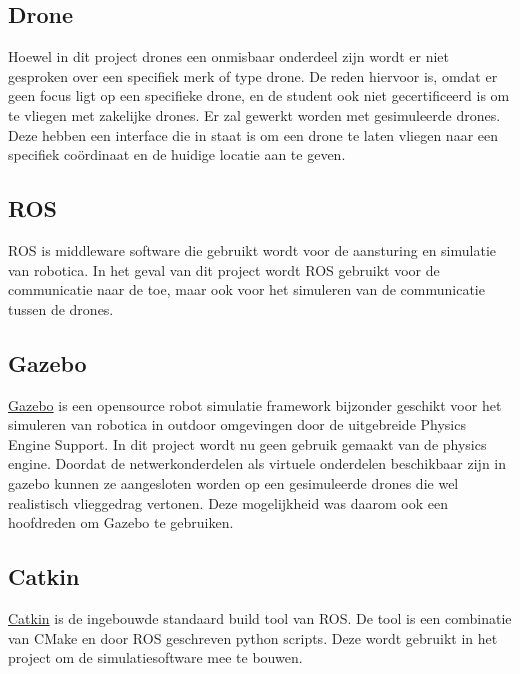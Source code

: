 \documentclass[a4paper, 11pt, oneside]{report}
\begin{document}
\subsection{Drone}
\label{inleiding:werkomgeving:drone}
Hoewel in dit project drones een onmisbaar onderdeel zijn wordt er niet gesproken over een specifiek merk of type drone.
De reden hiervoor is, omdat er geen focus ligt op een specifieke drone, en de student ook niet gecertificeerd is om te vliegen met zakelijke drones.
Er zal gewerkt worden met gesimuleerde drones. 
Deze hebben een interface die in staat is om een drone te laten vliegen naar een specifiek coördinaat en de huidige locatie aan te geven.

\subsection{ROS}
\label{inleiding:werkomgeving:ros}
ROS is middleware software die gebruikt wordt voor de aansturing en simulatie van robotica. 
In het geval van dit project wordt ROS gebruikt voor de communicatie naar de  toe, maar ook voor het simuleren van de  communicatie tussen de drones. 

\subsection{Gazebo}
\label{inleiding:werkomgeving:gazebo}

\href{http://gazebosim.org/}{Gazebo} is een opensource robot simulatie framework bijzonder geschikt voor het simuleren van robotica in outdoor omgevingen door de uitgebreide Physics Engine Support.
In dit project wordt nu geen gebruik gemaakt van de physics engine. Doordat de netwerkonderdelen als virtuele onderdelen beschikbaar zijn in gazebo kunnen ze aangesloten worden op een gesimuleerde drones die wel realistisch vlieggedrag vertonen.
Deze mogelijkheid was daarom ook een hoofdreden om Gazebo te gebruiken.

\subsection{Catkin}
\label{inleiding:werkomgeving:catkin}

\href{http://wiki.ros.org/catkin}{Catkin} is de ingebouwde standaard build tool van ROS. De tool is een combinatie van CMake en door ROS geschreven python scripts. Deze wordt gebruikt in het project om de simulatiesoftware mee te bouwen. 
\end{document}
